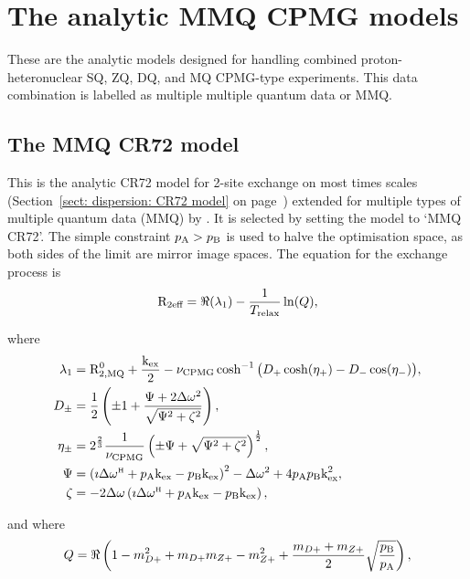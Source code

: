 
\section{The analytic MMQ CPMG models}
\label{sect: dispersion: analytic MMQ CPMG models}

These are the analytic models designed for handling combined proton-heteronuclear SQ, ZQ, DQ, and MQ CPMG-type experiments.
This data combination is labelled as multiple multiple quantum data or MMQ.



\subsection{The MMQ CR72 model}
\label{sect: dispersion: MMQ CR72 model}

This is the analytic CR72 model for 2-site exchange on most times scales (Section~\ref{sect: dispersion: CR72 model} on page~\pageref{sect: dispersion: CR72 model}) extended for multiple types of multiple quantum data (MMQ) by \citet{Korzhnev04a}.
It is selected by setting the model to `MMQ CR72'.
The simple constraint $p_\textrm{A} > p_\textrm{B}$ is used to halve the optimisation space, as both sides of the limit are mirror image spaces.
The equation for the exchange process is 
\begin{equation}
    \mathrm{R}_\textrm{2eff} = \Re(\lambda_1) - \frac{1}{T_\textrm{relax}}\ln(Q),
\end{equation}

where
\begin{align}
    \lambda_1 &= \mathrm{R}_\mathrm{2,MQ}^0 + \frac{\textrm{k}_\textrm{ex}}{2} - \nu_\textrm{CPMG}\cosh^{-1} \big( D_+\cosh(\eta_+) - D_-\cos(\eta_-) \big), \\
    D_\pm     &= \frac{1}{2} \left( \pm1 + \frac{\Psi + 2\Delta\omega^2}{\sqrt{\Psi^2 + \zeta^2}} \right) , \\
    \eta_\pm  &= 2^{\frac{2}{3}}\frac{1}{\nu_\textrm{CPMG}} \left( \pm\Psi + \sqrt{\Psi^2 + \zeta^2} \right)^{\frac{1}{2}} , \\
    \Psi      &= \left( \imath \Delta\omega^{\scriptscriptstyle\mathrm{H}} + p_\textrm{A}\textrm{k}_\textrm{ex} - p_\textrm{B}\textrm{k}_\textrm{ex} \right)^2 - \Delta\omega^2 + 4p_\textrm{A}p_\textrm{B}\textrm{k}_\textrm{ex}^2 , \\
    \zeta     &= -2\Delta\omega \left( \imath \Delta\omega^{\scriptscriptstyle\mathrm{H}} + p_\textrm{A}\textrm{k}_\textrm{ex} - p_\textrm{B}\textrm{k}_\textrm{ex} \right),
\end{align}

and where
\begin{equation}
    Q = \Re \left( 1 - m_{D+}^2 + m_{D+} m_{Z+} - m_{Z+}^2 + \frac{m_{D+} + m_{Z+}}{2} \sqrt{\frac{p_\textrm{B}}{p_\textrm{A}}} \right),
\end{equation}

